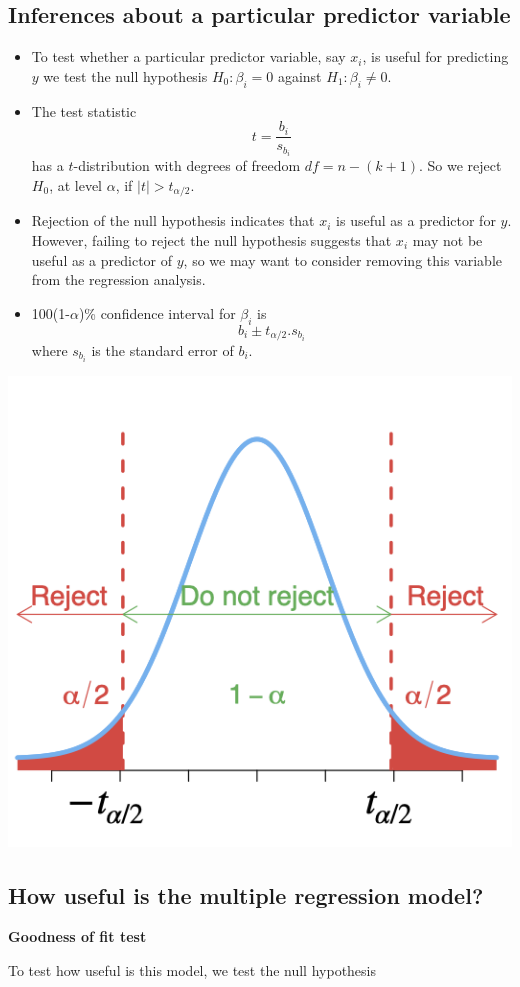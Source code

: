 \documentclass[
]{article}
\begin{document}
\hypertarget{inferences-about-a-particular-predictor-variable}{%
\subsection{Inferences about a particular predictor
variable}\label{inferences-about-a-particular-predictor-variable}}

\begin{itemize}
\item
  To test whether a particular predictor variable, say \(x_i\), is
  useful for predicting \(y\) we test the null hypothesis
  \(H_0:\beta_i=0\) against \(H_1:\beta_i\neq 0\).
\item
  The test statistic \[t=\frac{b_i}{s_{b_i}}\] has a \(t\)-distribution
  with degrees of freedom \(df=n-(k+1)\). So we reject \(H_0\), at level
  \(\alpha\), if \(|t|>t_{\alpha/2}.\)
\item
  Rejection of the null hypothesis indicates that \(x_i\) is useful as a
  predictor for \(y\). However, failing to reject the null hypothesis
  suggests that \(x_i\) may not be useful as a predictor of \(y\), so we
  may want to consider removing this variable from the regression
  analysis.
\item
  100(1-\(\alpha\))\% confidence interval for \(\beta_i\) is
  \[b_i \pm t_{\alpha/2} . s_{b_i}\] where \(s_{b_i}\) is the standard
  error of \(b_i\).
\end{itemize}

\begin{center}\includegraphics[width=0.3\linewidth,height=0.3\textheight]{figures/Ttest2} \end{center}

\hypertarget{how-useful-is-the-multiple-regression-model}{%
\subsection{How useful is the multiple regression
model?}\label{how-useful-is-the-multiple-regression-model}}

\textbf{Goodness of fit test}

To test how useful is this model, we test the null hypothesis
\end{document}
